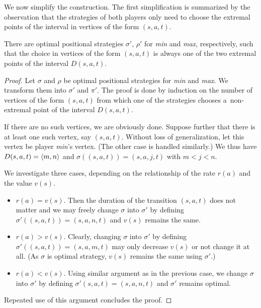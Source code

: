 We now simplify the construction. The first simplification is summarized by the
observation that the strategies of both players only need to choose the
extremal points of the interval in vertices of the form $(s,a,t)$. 

\begin{lemma}\label{lem:extremal}
There are
optimal positional strategies $\sigma'$,
$\rho'$ for \emph{min} and \emph{max}, respectively, such that the choice in vertices of the form $(s,a,t)$ is always one of
the two extremal points of the interval $D(s,a,t)$.
\end{lemma}
\begin{proof}
Let $\sigma$ and $\rho$ be optimal positional strategies for \emph{min} and
\emph{max}. We transform them into $\sigma'$ and $\pi'$. The proof is done by induction on the number of vertices of the
form $(s,a,t)$ from which one of the strategies chooses a~non-extremal point of
the interval $D(s,a,t)$.

If there are no such vertices, we are obviously done. Suppose further that
there is at least one such vertex, say $(s,a,t)$. Without loss of
generalization, let this vertex be player \emph{min}'s vertex. (The other case
is handled similarly.) We thus have $D(s,a,t) = \langle m,n\rangle$ and $\sigma((s,a,t))
= (s,a,j,t)$ with $m < j < n$.

We investigate three cases, depending on the relationship of the rate $r(a)$ and the value $v(s)$.
\begin{itemize}
\item $r(a) = v(s)$. Then the duration of the transition $(s,a,t)$ does not matter
	and we may freely change $\sigma$ into $\sigma'$ by defining 
	$\sigma'((s,a,t)) = (s,a,n,t)$ and $v(s)$ remains the same.
\item $r(a) > v(s)$. Clearly, changing $\sigma$ into $\sigma'$ by defining
	$\sigma'((s,a,t)) = (s,a,m,t)$ may only decrease $v(s)$ or not change it
	at all. (As $\sigma$ is optimal strategy, $v(s)$ remains the same
	using $\sigma'$.)
\item $r(a) < v(s)$. Using similar argument as in the previous case, we change
	$\sigma$ into $\sigma'$ by defining $\sigma'(s,a,t) = (s,a,n,t)$ and $\sigma'$ remains optimal.
\end{itemize}
Repeated use of this argument concludes the proof.
\end{proof}


